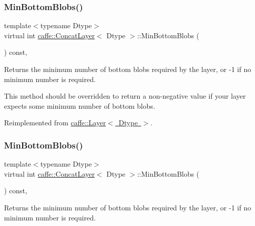 \subsubsection{\texorpdfstring{Min\+Bottom\+Blobs()}{MinBottomBlobs()}\hspace{0.1cm}{\footnotesize\ttfamily [1/2]}}
{\footnotesize\ttfamily template$<$typename Dtype$>$ \\
virtual int \mbox{\hyperlink{classcaffe_1_1_concat_layer}{caffe\+::\+Concat\+Layer}}$<$ Dtype $>$\+::Min\+Bottom\+Blobs (\begin{DoxyParamCaption}{ }\end{DoxyParamCaption}) const\hspace{0.3cm}{\ttfamily [inline]}, {\ttfamily [virtual]}}



Returns the minimum number of bottom blobs required by the layer, or -\/1 if no minimum number is required. 

This method should be overridden to return a non-\/negative value if your layer expects some minimum number of bottom blobs. 

Reimplemented from \mbox{\hyperlink{classcaffe_1_1_layer_aca3cb2bafaefda5d4760aaebd0b72def}{caffe\+::\+Layer$<$ Dtype $>$}}.

\mbox{\label{classcaffe_1_1_concat_layer_a314de9eb00a296ffd3cf84120bd1601e}} 
\subsubsection{\texorpdfstring{Min\+Bottom\+Blobs()}{MinBottomBlobs()}\hspace{0.1cm}{\footnotesize\ttfamily [2/2]}}
{\footnotesize\ttfamily template$<$typename Dtype$>$ \\
virtual int \mbox{\hyperlink{classcaffe_1_1_concat_layer}{caffe\+::\+Concat\+Layer}}$<$ Dtype $>$\+::Min\+Bottom\+Blobs (\begin{DoxyParamCaption}{ }\end{DoxyParamCaption}) const\hspace{0.3cm}{\ttfamily [inline]}, {\ttfamily [virtual]}}



Returns the minimum number of bottom blobs required by the layer, or -\/1 if no minimum number is required. 

